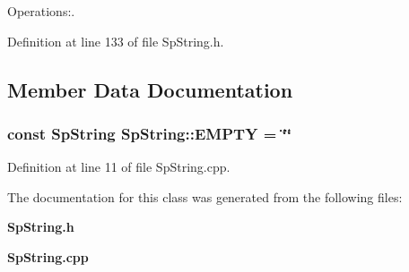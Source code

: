 Operations:. 

Definition at line 133 of file Sp\-String.h.

\subsection{Member Data Documentation}
\subsubsection{\setlength{\rightskip}{0pt plus 5cm}const {\bf Sp\-String} {\bf Sp\-String::EMPTY} = \char`\"{}\char`\"{}\hspace{0.3cm}{\tt  [static]}}\label{classSpark_1_1SpString_s0}


Definition at line 11 of file Sp\-String.cpp.

The documentation for this class was generated from the following files:\begin{CompactItemize}
\item 
{\bf Sp\-String.h}\item 
{\bf Sp\-String.cpp}\end{CompactItemize}
